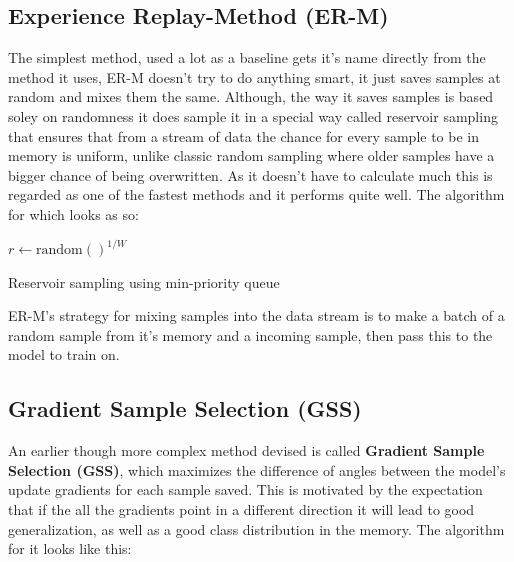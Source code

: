 \documentclass[oneside]{ctuthesis}
\begin{document}
\subsection{Experience Replay-Method (ER-M)}
The simplest method, used a lot as a baseline gets it's name directly from the method it uses, ER-M doesn't try to do anything smart, it just saves samples at random and mixes them the same. Although, the way it saves samples is based soley on randomness it does sample it in a special way called reservoir sampling that ensures that from a stream of data the chance for every sample to be in memory is uniform, unlike classic random sampling where older samples have a bigger chance of being overwritten. As it doesn't have to calculate much this is regarded as one of the fastest methods and it performs quite well. The algorithm for which looks as so:
\begin{algorithm}[t]
\SetAlgoNoEnd


  $r \leftarrow \text{random}()^ {1/W} $ \tcp*{\textit{uniform (0, 1]}}

\caption{Reservoir sampling using min-priority queue}
\label{alg:reservoir}
\end{algorithm}

ER-M's strategy for mixing samples into the data stream is to make a batch of a random sample from it's memory and a incoming sample, then pass this to the model to train on.

\subsection{Gradient Sample Selection (GSS)}

An earlier though more complex method devised is called \textbf{Gradient Sample Selection (GSS)}, which maximizes the difference of angles between the model's update gradients for each sample saved. This is motivated by the expectation that if the all the gradients point in a different direction it will lead to good generalization, as well as a good class distribution in the memory. The algorithm for it looks like this:
\end{document}

